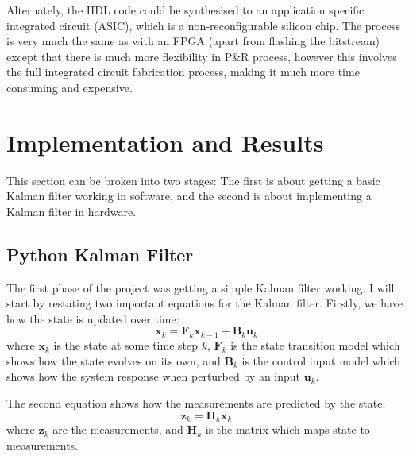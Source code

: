 \documentclass[12pt]{article}
\begin{document}
Alternately, the HDL code could be synthesised to an application specific integrated circuit (ASIC), which is a non-reconfigurable silicon chip. The process is very much the same as with an FPGA (apart from flashing the bitstream) except that there is much more flexibility in P\&R process, however this involves the full integrated circuit fabrication process, making it much more time consuming and expensive.

\section{Implementation and Results}

This section can be broken into two stages: The first is about getting a basic Kalman filter working in software, and the second is about implementing a Kalman filter in hardware.

\subsection{Python Kalman Filter}
The first phase of the project was getting a simple Kalman filter working. I will start by restating two important equations for the Kalman filter. Firstly, we have how the state is updated over time:
$$\mathbf{x}_k = \mathbf{F}_k \mathbf{x}_{k-1} + \mathbf{B}_k \mathbf{u}_k$$
where $\mathbf{x}_k$ is the state at some time step $k$, $\mathbf{F}_k$ is the state transition model which shows how the state evolves on its own, and $\mathbf{B}_k$ is the control input model which shows how the system response when perturbed by an input $\mathbf{u}_k$.

The second equation shows how the measurements are predicted by the state:
$$\mathbf{z}_k = \mathbf{H}_k \mathbf{x}_k$$
where $\mathbf{z}_k$ are the measurements, and $\mathbf{H}_k$ is the matrix which maps state to measurements.
\end{document}

